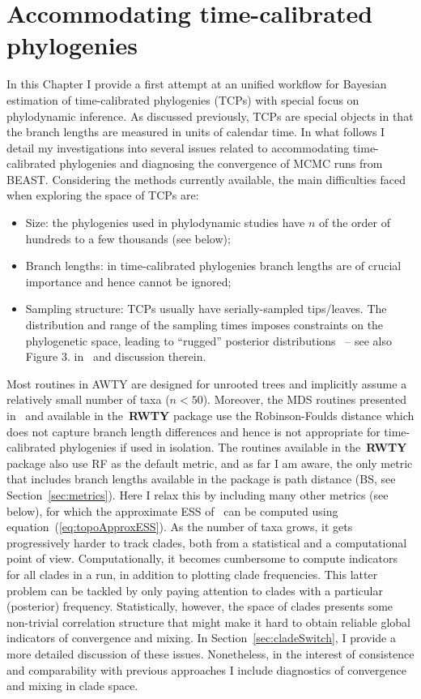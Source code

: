 \section{Accommodating time-calibrated phylogenies}
\label{sec:accommodating}

In this Chapter I provide a first attempt at an unified workflow for Bayesian estimation of time-calibrated phylogenies (TCPs) with special focus on phylodynamic inference.
As discussed previously, TCPs are special objects in that the branch lengths are measured in units of calendar time.
In what follows I detail my investigations into several issues related to accommodating time-calibrated phylogenies and diagnosing the convergence of MCMC runs from BEAST.
Considering the methods currently available, the main difficulties faced when exploring the space of TCPs are:
\begin{itemize}
 \item Size: the phylogenies used in phylodynamic studies have $n$ of the order of hundreds to a few thousands (see below);
 \item Branch lengths: in time-calibrated phylogenies branch lengths are of crucial importance and hence cannot be ignored;
 \item Sampling structure: TCPs usually have serially-sampled tips/leaves.
 The distribution and range of the sampling times imposes constraints on the phylogenetic space, leading to ``rugged'' posterior distributions~\citep{Brown2018} -- see also Figure 3. in~\cite{Moller2018} and discussion therein. 
\end{itemize}

Most routines in AWTY are designed for unrooted trees and implicitly assume a relatively small number of taxa ($n < 50$).
Moreover, the MDS routines presented in~\cite{Hillis2005} and available in the~\textbf{RWTY} package use the Robinson-Foulds distance which does not capture branch length differences and hence is not appropriate for time-calibrated phylogenies if used in isolation.
The routines available in the~\textbf{RWTY} package also use RF as the default metric, and as far I am aware, the only metric that includes branch lengths available in the package is path distance (BS, see Section~\ref{sec:metrics}).
Here I relax this by including many other metrics (see below), for which the approximate ESS of~\cite{Lanfear2016} can be computed using equation~(\ref{eq:topoApproxESS}).
As the number of taxa grows, it gets progressively harder to track clades, both from a statistical and a computational point of view.
Computationally, it becomes cumbersome to compute indicators for all clades in a run, in addition to plotting clade frequencies.
This latter problem can be tackled by only paying attention to clades with a particular (posterior) frequency.
Statistically, however, the space of clades presents some non-trivial correlation structure that might make it hard to obtain reliable global indicators of convergence and mixing.
In Section~\ref{sec:cladeSwitch}, I provide a more detailed discussion of these issues.
Nonetheless, in the interest of consistence and comparability with previous approaches I include diagnostics of convergence and mixing in clade space. 

